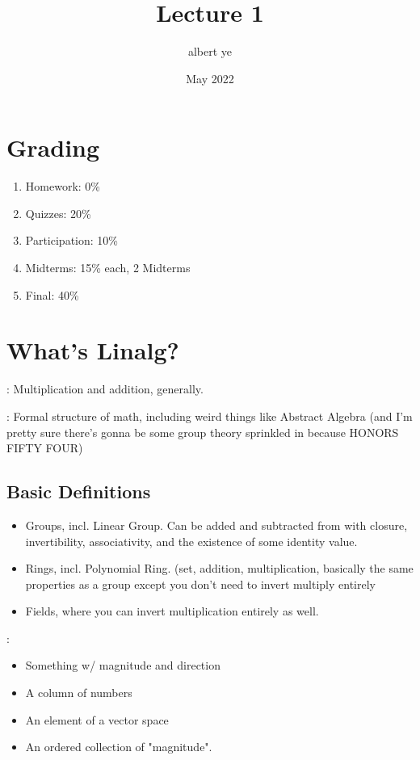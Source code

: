 \documentclass{scrartcl}
\title{Lecture 1}
\author{albert ye}
\date{May 2022}
\begin{document}
\maketitle
\section{Grading}
\begin{enumerate}
	\item Homework: 0\%
	\item Quizzes: 20\%
	\item Participation: 10\%
	\item Midterms: 15\% each, 2 Midterms
	\item Final: 40\%
\end{enumerate}

\section{What's Linalg?}
: Multiplication and addition, generally.

: Formal structure of math, including weird things like Abstract Algebra
(and I'm pretty sure there's gonna be some group theory sprinkled in because HONORS FIFTY FOUR)

\subsection{Basic Definitions} %
\begin{itemize}
	\item Groups, incl. Linear Group. Can be added and subtracted from with closure, invertibility, 
	associativity, and the existence of some identity value.
	\item Rings, incl. Polynomial Ring. (set, addition, multiplication, basically the same
	properties as a group except you don't need to invert multiply entirely
	\item Fields, where you can invert multiplication entirely as well.
\end{itemize}

:
\begin{itemize}
	\item Something w/ magnitude and direction
	\item A column of numbers
	\item An element of a vector space
	\item An ordered collection of "magnitude".
\end{itemize}
\end{document}
